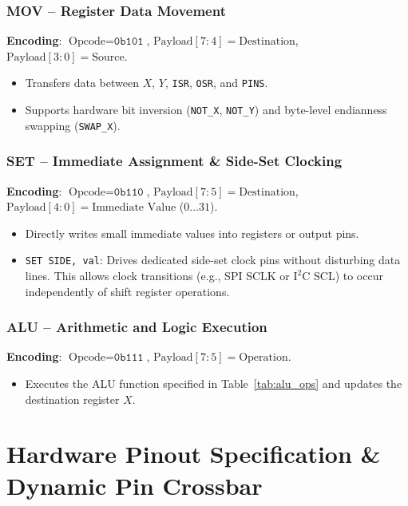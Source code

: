 \documentclass[11pt,a4paper]{article}
\begin{document}
\subsubsection{MOV -- Register Data Movement}
\textbf{Encoding}: $\text{Opcode} = \texttt{0b101}$, $\text{Payload}[7:4] = \text{Destination}$, $\text{Payload}[3:0] = \text{Source}$.
\begin{itemize}
    \item Transfers data between $X$, $Y$, \texttt{ISR}, \texttt{OSR}, and \texttt{PINS}.
    \item Supports hardware bit inversion (\texttt{NOT\_X}, \texttt{NOT\_Y}) and byte-level endianness swapping (\texttt{SWAP\_X}).
\end{itemize}

\subsubsection{SET -- Immediate Assignment \& Side-Set Clocking}
\textbf{Encoding}: $\text{Opcode} = \texttt{0b110}$, $\text{Payload}[7:5] = \text{Destination}$, $\text{Payload}[4:0] = \text{Immediate Value}$ ($0 \dots 31$).
\begin{itemize}
    \item Directly writes small immediate values into registers or output pins.
    \item \texttt{SET SIDE, val}: Drives dedicated side-set clock pins without disturbing data lines. This allows clock transitions (e.g., SPI SCLK or $\text{I}^2\text{C}$ SCL) to occur independently of shift register operations.
\end{itemize}

\subsubsection{ALU -- Arithmetic and Logic Execution}
\textbf{Encoding}: $\text{Opcode} = \texttt{0b111}$, $\text{Payload}[7:5] = \text{Operation}$.
\begin{itemize}
    \item Executes the ALU function specified in Table~\ref{tab:alu_ops} and updates the destination register $X$.
\end{itemize}

\section{Hardware Pinout Specification \& Dynamic Pin Crossbar}
\end{document}
